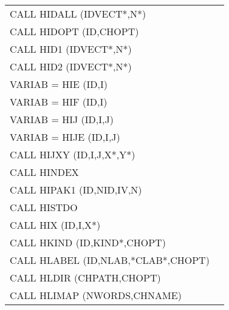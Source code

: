 \begin{longtable}{|>{\ttfamily\small}p{.9\linewidth}r|}
CALL     HIDALL  (IDVECT*,N*)                 
&                                                       \pageref{HIDALL} \\
CALL     HIDOPT (ID,CHOPT)                   
&                                                       \pageref{HIDOPT} \\
CALL     HID1   (IDVECT*,N*)                 
&                                                       \pageref{HID1}   \\
CALL     HID2   (IDVECT*,N*)                 
&                                                       \pageref{HID2}   \\
VARIAB = HIE    (ID,I)                       
&                                                       \pageref{HIE}    \\
VARIAB = HIF    (ID,I)                       
&                                                       \pageref{HIF}    \\
VARIAB = HIJ    (ID,I,J)                     
&                                                       \pageref{HIJ}    \\
VARIAB = HIJE   (ID,I,J)                     
&                                                       \pageref{HIJE}   \\
CALL     HIJXY  (ID,I,J,X*,Y*)               
&                                                       \pageref{HIJXY}  \\
CALL     HINDEX                              
&                                                       \pageref{HINDEX} \\
CALL     HIPAK1 (ID,NID,IV,N)                
&                                                       \pageref{HIPAK1} \\
CALL     HISTDO                              
&                                                       \pageref{HISTDO} \\
CALL     HIX    (ID,I,X*)                    
&                                                       \pageref{HIX}    \\
CALL     HKIND  (ID,KIND*,CHOPT)
&                                                       \pageref{HKIND}  \\
CALL     HLABEL (ID,NLAB,*CLAB*,CHOPT)
&                                                       \pageref{HLABEL} \\
CALL     HLDIR  (CHPATH,CHOPT)               
&                                                       \pageref{HLDIR}  \\
CALL     HLIMAP (NWORDS,CHNAME)

\end{longtable}
